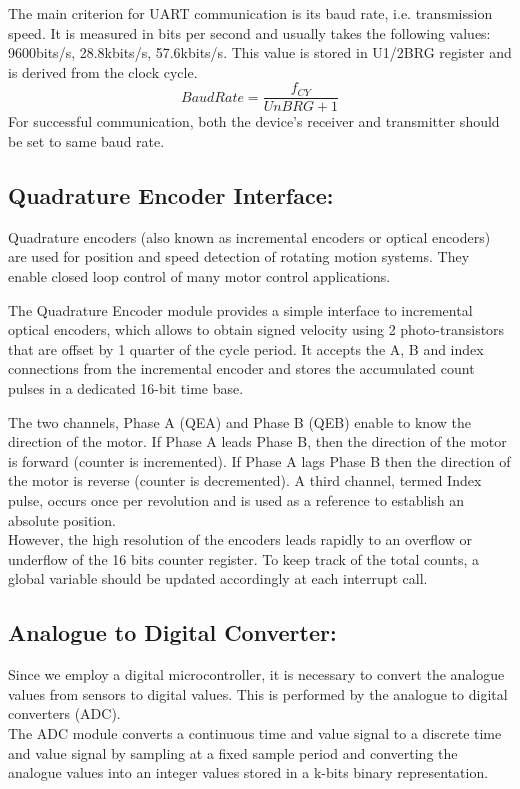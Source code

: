 The main criterion for UART communication is its baud rate, i.e. transmission speed. It is measured in bits per second and usually takes the following values: 9600bits/s, 28.8kbits/s, 57.6kbits/s.
This value is stored in U1/2BRG register and is derived from the clock cycle.
$$BaudRate = \frac{f_{CY}}{UnBRG+1}$$
For successful communication, both the device’s receiver and transmitter should be set to same baud rate.


\subsection{Quadrature Encoder Interface:}

Quadrature encoders (also known as incremental encoders or optical encoders) are used for position and speed detection of rotating motion systems. They enable closed loop control of many motor control applications.

The Quadrature Encoder module provides a simple interface to incremental optical encoders, which allows to obtain signed velocity using 2 photo-transistors that are offset by 1 quarter of the cycle period. It accepts the A, B and index connections from the incremental encoder and stores the accumulated count pulses in a dedicated 16-bit time base.

The two channels, Phase A (QEA) and Phase B (QEB) enable to know the direction of the motor. If Phase A leads Phase B, then the direction of the motor is forward (counter is incremented). If Phase A lags Phase B then the direction of the motor is reverse (counter is decremented). A third channel, termed Index pulse, occurs once per revolution and is used as a reference to establish an absolute position.\\
However, the high resolution of the encoders leads rapidly to an overflow or underflow of the 16 bits counter register. To keep track of the total counts, a global variable should be updated accordingly at each interrupt call.

\subsection{Analogue to Digital Converter:}

Since we employ a digital microcontroller, it is necessary to convert the analogue values from sensors to digital values. This is performed by the analogue to digital converters (ADC).\\
The ADC module converts a continuous time and value signal to a discrete time and value signal by sampling at a fixed sample period and converting the analogue values into an integer values stored in a k-bits binary representation.

